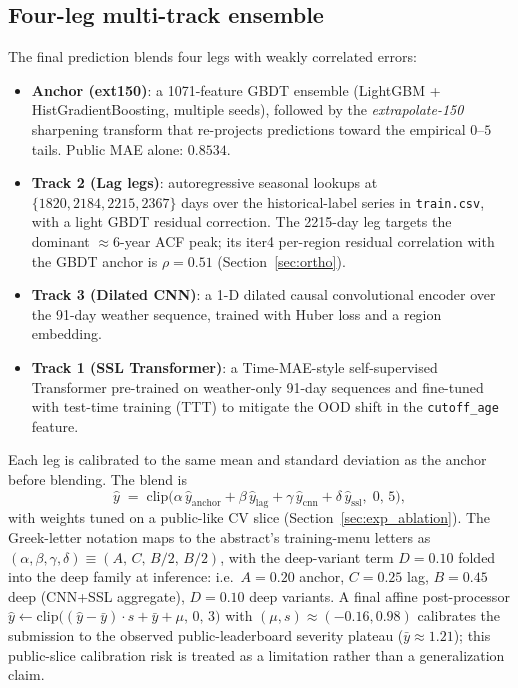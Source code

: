 \documentclass[conference,10pt,a4paper]{IEEEtran}
\begin{document}
\subsection{Four-leg multi-track ensemble}
The final prediction blends four legs with weakly correlated errors:
\begin{itemize}
\item \textbf{Anchor (ext150)}: a 1071-feature GBDT ensemble (LightGBM + HistGradientBoosting, multiple seeds), followed by the \emph{extrapolate-150} sharpening transform that re-projects predictions toward the empirical $0$--$5$ tails. Public MAE alone: $0.8534$.
\item \textbf{Track 2 (Lag legs)}: autoregressive seasonal lookups at $\{1820, 2184, 2215, 2367\}$ days over the historical-label series in \texttt{train.csv}, with a light GBDT residual correction. The 2215-day leg targets the dominant $\approx$6-year ACF peak; its iter4 per-region residual correlation with the GBDT anchor is $\rho{=}0.51$ (Section~\ref{sec:ortho}).
\item \textbf{Track 3 (Dilated CNN)}: a 1-D dilated causal convolutional encoder over the 91-day weather sequence, trained with Huber loss and a region embedding.
\item \textbf{Track 1 (SSL Transformer)}: a Time-MAE-style self-supervised Transformer pre-trained on weather-only 91-day sequences and fine-tuned with test-time training (TTT) to mitigate the OOD shift in the \texttt{cutoff\_age} feature.
\end{itemize}
Each leg is calibrated to the same mean and standard deviation as the anchor before blending. The blend is
\[
\hat y \;=\; \mathrm{clip}\!\bigl(\alpha\, \hat y_{\text{anchor}} + \beta\, \hat y_{\text{lag}} + \gamma\, \hat y_{\text{cnn}} + \delta\, \hat y_{\text{ssl}},\; 0,\, 5\bigr),
\]
with weights tuned on a public-like CV slice (Section~\ref{sec:exp_ablation}). The Greek-letter notation maps to the abstract's training-menu letters as $(\alpha,\beta,\gamma,\delta)\equiv(A,\,C,\,B/2,\,B/2)$, with the deep-variant term $D{=}0.10$ folded into the deep family at inference: i.e.\ $A{=}0.20$ anchor, $C{=}0.25$ lag, $B{=}0.45$ deep (CNN+SSL aggregate), $D{=}0.10$ deep variants. A final affine post-processor $\hat y \leftarrow \mathrm{clip}\bigl((\hat y - \bar y)\cdot s + \bar y + \mu,\, 0,\, 3\bigr)$ with $(\mu,s)\approx(-0.16,0.98)$ calibrates the submission to the observed public-leaderboard severity plateau ($\bar y \approx 1.21$); this public-slice calibration risk is treated as a limitation rather than a generalization claim.
\end{document}
